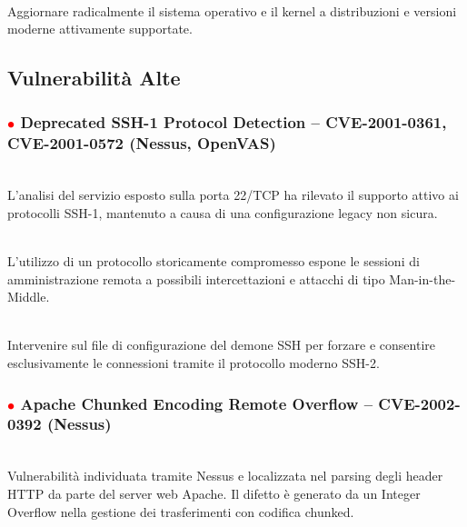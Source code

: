 \documentclass[12pt, a4paper]{article}
\begin{document}
	\vspace{0.2 cm}
	 \\ \vspace{0.2 cm}
	Aggiornare radicalmente il sistema operativo e il kernel a distribuzioni e versioni moderne attivamente supportate.

	\newpage
	\subsection{Vulnerabilità Alte}

	\subsubsection{\textcolor{red}{$\bullet$} Deprecated SSH-1 Protocol Detection -- CVE-2001-0361, CVE-2001-0572 (Nessus, OpenVAS)}
	\\\vspace{0.2 cm}
	L'analisi del servizio esposto sulla porta 22/TCP ha rilevato il supporto attivo ai protocolli SSH-1, mantenuto a causa di una configurazione legacy non sicura.

	\vspace{0.2 cm}
	\\\vspace{0.2 cm}
	L'utilizzo di un protocollo storicamente compromesso espone le sessioni di amministrazione remota a possibili intercettazioni e attacchi di tipo Man-in-the-Middle.

	\vspace{0.2 cm}
	\\\vspace{0.2 cm}
	Intervenire sul file di configurazione del demone SSH per forzare e consentire esclusivamente le connessioni tramite il protocollo moderno SSH-2.

	\subsubsection{\textcolor{red}{$\bullet$} Apache Chunked Encoding Remote Overflow -- CVE-2002-0392 (Nessus)}
	 \\\vspace{0.2 cm}
	Vulnerabilità individuata tramite Nessus e localizzata nel parsing degli header HTTP da parte del server web Apache. Il difetto è generato da un Integer Overflow nella gestione dei trasferimenti con codifica chunked.
\end{document}
